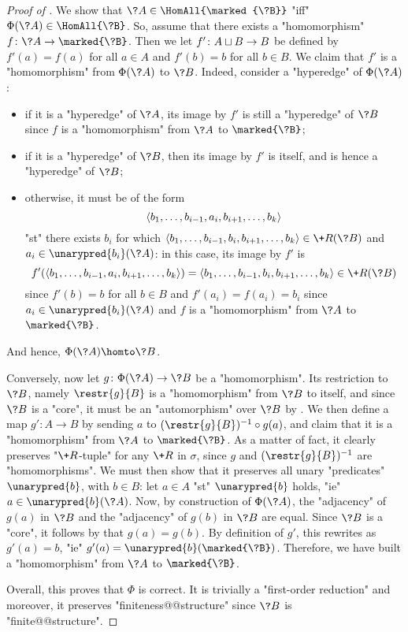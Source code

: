 \begin{proof}[Proof of ]
	We show that $\?A \in \HomAll{\marked{\?B}}$ "iff" $\Phi(\?A) \in \HomAll{\?B}$.
	So, assume that there exists a "homomorphism" $f\colon \?A \to \marked{\?B}$.
	Then we let $f'\colon A \sqcup B \to B$ be defined by $f'(a) = f(a)$ for all $a\in A$ and
	$f'(b) = b$ for all $b \in B$. We claim that $f'$ is a "homomorphism" from
	$\Phi(\?A)$ to $\?B$. Indeed, consider a "hyperedge" of $\Phi(\?A)$:
	\begin{itemize}
		\item if it is a "hyperedge" of $\?A$, its image by $f'$ is still a "hyperedge"
			of $\?B$ since $f$ is a "homomorphism" from $\?A$ to $\marked{\?B}$;
		\item if it is a "hyperedge" of $\?B$, then its image by $f'$ is itself, and is hence
			a "hyperedge" of $\?B$;
		\item otherwise, it must be of the form 
			\[\langle b_1,\dotsc,b_{i-1}, a_i, b_{i+1},\dotsc,b_k\rangle\]
			"st" there exists $b_i$ for which
			$\tup{b_1,\dotsc,b_{i-1}, b_i, b_{i+1},\dotsc,b_k} \in \+R(\?B)$
			and $a_i \in \unarypred{b_i}(\?A)$:
			in this case, its image by $f'$ is 
			\[f'(\tup{b_1,\dotsc,b_{i-1}, a_i, b_{i+1},\dotsc,b_k})
			= \tup{b_1,\dotsc,b_{i-1}, b_i, b_{i+1},\dotsc,b_k} \in \+R(\?B)\]
			since $f'(b) = b$ for all $b\in B$ and $f'(a_i) = f(a_i) = b_i$ since
			$a_i \in \unarypred{b_i}(\?A)$ and $f$ is a "homomorphism" from
			$\?A$ to $\marked{\?B}$.
	\end{itemize}
	And hence, $\Phi(\?A) \homto \?B$.

	Conversely, now let $g\colon \Phi(\?A) \to \?B$ be a "homomorphism".
	Its restriction to $\?B$, namely $\restr{g}{B}$ is a "homomorphism" from $\?B$
	to itself, and since $\?B$ is a "core", it must be an "automorphism" over $\?B$
	by .
	We then define a map $g' \colon A \to B$ by sending
	$a$ to $(\restr{g}{B})^{-1}\circ g(a)$, and claim that it is a "homomorphism"
	from $\?A$ to $\marked{\?B}$. As a matter of fact, it clearly preserves "$\+R$-tuple"
	for any $\+R$ in $\sigma$, since $g$ and $(\restr{g}{B})^{-1}$ are "homomorphisms".
	We must then show that it preserves all unary "predicates" $\unarypred{b}$, with $b\in B$:
	let $a \in A$ "st" $\unarypred{b}$ holds, "ie" $a \in \unarypred{b}(\?A)$.
	Now, by construction of $\Phi(\?A)$, the "adjacency" of $g(a)$ in $\?B$
	and the "adjacency" of $g(b)$ in $\?B$ are equal.
	Since $\?B$ is a "core", it follows by  that $g(a) = g(b)$.
	By definition of $g'$, this rewrites as $g'(a) = b$, "ie" $g'(a) = \unarypred{b}(\marked{\?B})$.
	Therefore, we have built a "homomorphism" from $\?A$ to $\marked{\?B}$.

	Overall, this proves that $\Phi$ is correct.
	It is trivially a "first-order reduction" and moreover,
	it preserves "finiteness@@structure" since $\?B$
	is "finite@@structure".
\end{proof}


